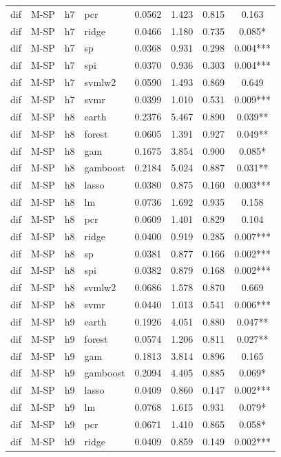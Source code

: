 \begin{ThreePartTable}
\begin{longtable}[t]{llclcccc}
dif & M-SP & h7 & pcr & 0.0562 & 1.423 & 0.815 & 0.163\\
dif & M-SP & h7 & ridge & 0.0466 & 1.180 & 0.735 & 0.085*\\
dif & M-SP & h7 & sp & 0.0368 & 0.931 & 0.298 & 0.004***\\
dif & M-SP & h7 & spi & 0.0370 & 0.936 & 0.303 & 0.004***\\
dif & M-SP & h7 & svmlw2 & 0.0590 & 1.493 & 0.869 & 0.649\\
dif & M-SP & h7 & svmr & 0.0399 & 1.010 & 0.531 & 0.009***\\
\addlinespace
dif & M-SP & h8 & earth & 0.2376 & 5.467 & 0.890 & 0.039**\\
dif & M-SP & h8 & forest & 0.0605 & 1.391 & 0.927 & 0.049**\\
dif & M-SP & h8 & gam & 0.1675 & 3.854 & 0.900 & 0.085*\\
dif & M-SP & h8 & gamboost & 0.2184 & 5.024 & 0.887 & 0.031**\\
dif & M-SP & h8 & lasso & 0.0380 & 0.875 & 0.160 & 0.003***\\
dif & M-SP & h8 & lm & 0.0736 & 1.692 & 0.935 & 0.158\\
dif & M-SP & h8 & pcr & 0.0609 & 1.401 & 0.829 & 0.104\\
dif & M-SP & h8 & ridge & 0.0400 & 0.919 & 0.285 & 0.007***\\
dif & M-SP & h8 & sp & 0.0381 & 0.877 & 0.166 & 0.002***\\
dif & M-SP & h8 & spi & 0.0382 & 0.879 & 0.168 & 0.002***\\
dif & M-SP & h8 & svmlw2 & 0.0686 & 1.578 & 0.870 & 0.669\\
dif & M-SP & h8 & svmr & 0.0440 & 1.013 & 0.541 & 0.006***\\
\addlinespace
dif & M-SP & h9 & earth & 0.1926 & 4.051 & 0.880 & 0.047**\\
dif & M-SP & h9 & forest & 0.0574 & 1.206 & 0.811 & 0.027**\\
dif & M-SP & h9 & gam & 0.1813 & 3.814 & 0.896 & 0.165\\
dif & M-SP & h9 & gamboost & 0.2094 & 4.405 & 0.885 & 0.069*\\
dif & M-SP & h9 & lasso & 0.0409 & 0.860 & 0.147 & 0.002***\\
dif & M-SP & h9 & lm & 0.0768 & 1.615 & 0.931 & 0.079*\\
dif & M-SP & h9 & pcr & 0.0671 & 1.410 & 0.865 & 0.058*\\
dif & M-SP & h9 & ridge & 0.0409 & 0.859 & 0.149 & 0.002***\\

\end{longtable}
\end{ThreePartTable}
